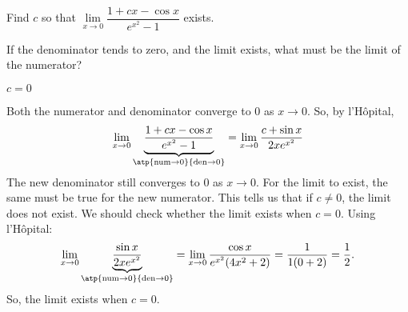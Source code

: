 \begin{question}[2009H]
 Find $c$ so that $\lim\limits_{x\rightarrow 0}
\dfrac{1+cx-\cos x}{ e^{x^2}-1}$ exists.
\end{question}
\begin{hint} If the denominator tends to zero, and the limit exists, what must be the limit of the numerator?
\end{hint}
\begin{answer} $c=0$
\end{answer}
\begin{solution}
Both the numerator and denominator converge to $0$ as
$x\rightarrow 0$. So, by l'H\^opital,
$$
\lim_{x\rightarrow 0}\underbrace{\frac{1+cx-\cos x}{ e^{x^2}-1}}_{\atp
	{\mathrm{num}\to 0}{\mathrm{den}\to 0}}
=\lim_{x\rightarrow 0}\frac{c+\sin x}{ 2xe^{x^2}}
$$
The new denominator still converges to $0$ as $x\rightarrow 0$. For
the limit to exist, the same must be true for the new numerator. This  tells us that if $c \neq 0$, the limit does not exist. We should check whether the limit exists when $c=0$.
Using l'H\^opital:
\[\lim_{x \to 0}\underbrace{\frac{\sin x}{2xe^{x^2}}}_{\atp
	{\mathrm{num}\to 0}{\mathrm{den}\to 0}}=\lim_{x \to 0}\frac{\cos x}{e^{x^2}(4x^2+2)}=\frac{1}{1(0+2)}=\frac{1}{2}.\]
	So, the limit exists when $c=0$.
\end{solution}




